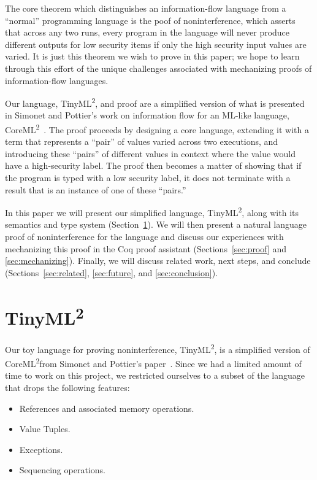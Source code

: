 \documentclass[a4paper,twocolumn]{article}
\newcommand{\langName}[0]{TinyML\textsuperscript{2}}
\newcommand{\origLang}[0]{CoreML\textsuperscript{2}}
\theoremstyle{plain}
\theoremstyle{definition}
\begin{document}
The core theorem which distinguishes an information-flow language from a 
``normal'' programming language is the poof of noninterference, 
which asserts that across any two runs, every program in the language will never
produce different outputs for low security items if only the high security input
values are varied.  It is just this theorem we wish to prove in this paper; we
hope to learn through this effort of the unique challenges associated with
mechanizing proofs of information-flow languages.

Our language, \langName,  and proof are a simplified version of what is
presented in Simonet and Pottier's work on information flow for an ML-like
language, \origLang~\cite{InfoFlowML}.  The proof proceeds by designing a
core language, extending it with a term that represents a ``pair'' of 
values varied across two executions, and introducing these ``pairs'' of 
different values in context where the value would have a high-security label.
The proof then becomes a matter of showing that if
the program is typed with a low security label, it does not terminate
with a result that is an instance of one of these ``pairs.''

In this paper we will present our simplified language, \langName,
along with its semantics and type system (Section~\ref{sec:lang}).  We will then
present a natural language proof of noninterference for the
language and discuss our experiences with mechanizing this proof in the Coq
proof assistant (Sections~\ref{sec:proof} and \ref{sec:mechanizing}).  Finally,
we will discuss related work, next steps, and conclude
(Sections~\ref{sec:related}, \ref{sec:future}, and \ref{sec:conclusion}).

\section{\langName}
\label{sec:lang}

Our toy language for proving noninterference, \langName, is a simplified version
of \origLang from Simonet and Pottier's paper~\cite{InfoFlowML}.  Since we had a
limited amount of time to work on this project, we restricted ourselves to a subset
of the language that drops the following features:

\begin{itemize}
  \item References and associated memory operations.
  \item Value Tuples.
  \item Exceptions.
  \item Sequencing operations.
\end{itemize}
\end{document}
